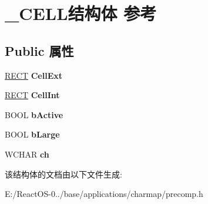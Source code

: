 \hypertarget{struct___c_e_l_l}{}\section{\+\_\+\+C\+E\+L\+L结构体 参考}
\label{struct___c_e_l_l}
\subsection*{Public 属性}
\begin{DoxyCompactItemize}
\item 
\mbox{\label{struct___c_e_l_l_a2cca0c9bfbd694ee102bc0e57f93ea53}} 
\hyperlink{structtag_r_e_c_t}{R\+E\+CT} {\bfseries Cell\+Ext}
\item 
\mbox{\label{struct___c_e_l_l_accb33242cfd83fe993ac0ebfdb7b969f}} 
\hyperlink{structtag_r_e_c_t}{R\+E\+CT} {\bfseries Cell\+Int}
\item 
\mbox{\label{struct___c_e_l_l_a3143346ef3948fa32029ea22b8bf4ccf}} 
B\+O\+OL {\bfseries b\+Active}
\item 
\mbox{\label{struct___c_e_l_l_a1452d95d4747ca44a14cbf725a8770fa}} 
B\+O\+OL {\bfseries b\+Large}
\item 
\mbox{\label{struct___c_e_l_l_a5e840af3d51bafd98eb6732a6ec3ec2a}} 
W\+C\+H\+AR {\bfseries ch}
\end{DoxyCompactItemize}


该结构体的文档由以下文件生成\+:\begin{DoxyCompactItemize}
\item 
E\+:/\+React\+O\+S-\/0../base/applications/charmap/precomp.\+h\end{DoxyCompactItemize}
